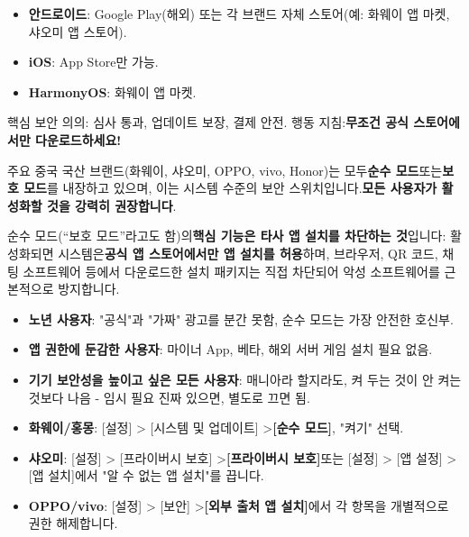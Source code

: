 


\begin{itemize}
  \item \textbf{안드로이드}: Google Play(해외) 또는 각 브랜드 자체 스토어(예: 화웨이 앱 마켓, 샤오미 앱 스토어).
  \item \textbf{iOS}: App Store만 가능.
  \item \textbf{HarmonyOS}: 화웨이 앱 마켓.
\end{itemize}

핵심 보안 의의: 심사 통과, 업데이트 보장, 결제 안전. 행동 지침:\textbf{무조건 공식 스토어에서만 다운로드하세요!}


주요 중국 국산 브랜드(화웨이, 샤오미, OPPO, vivo, Honor)는 모두\textbf{순수 모드}또는\textbf{보호 모드}를 내장하고 있으며, 이는 시스템 수준의 보안 스위치입니다.\textbf{모든 사용자가 활성화할 것을 강력히 권장합니다}.


순수 모드(“보호 모드”라고도 함)의\textbf{핵심 기능은 타사 앱 설치를 차단하는 것}입니다: 활성화되면 시스템은\textbf{공식 앱 스토어에서만 앱 설치를 허용}하며, 브라우저, QR 코드, 채팅 소프트웨어 등에서 다운로드한 설치 패키지는 직접 차단되어 악성 소프트웨어를 근본적으로 방지합니다.


\begin{itemize}
  \item \textbf{노년 사용자}: "공식"과 "가짜" 광고를 분간 못함, 순수 모드는 가장 안전한 호신부.
  \item \textbf{앱 권한에 둔감한 사용자}: 마이너 App, 베타, 해외 서버 게임 설치 필요 없음.
  \item \textbf{기기 보안성을 높이고 싶은 모든 사용자}: 매니아라 할지라도, 켜 두는 것이 안 켜는 것보다 나음 - 임시 필요 진짜 있으면, 별도로 끄면 됨.
\end{itemize}


\begin{itemize}
  \item \textbf{화웨이/홍몽}: [설정] > [시스템 및 업데이트] >\textbf{[순수 모드]}, "켜기" 선택.
  \item \textbf{샤오미}: [설정] > [프라이버시 보호] >\textbf{[프라이버시 보호]}또는 [설정] > [앱 설정] > [앱 설치]에서 "알 수 없는 앱 설치"를 끕니다.
  \item \textbf{OPPO/vivo}: [설정] > [보안] >\textbf{[외부 출처 앱 설치]}에서 각 항목을 개별적으로 권한 해제합니다.
\end{itemize}

